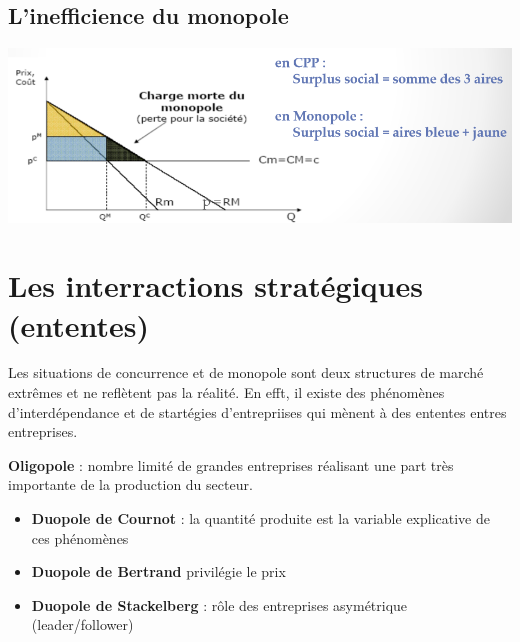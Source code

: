 \subsection{L'inefficience du monopole}
\begin{center}
    \includegraphics[scale=0.7]{Pics/Inefficience_monopole.png}
\end{center}
\newpage
\section{Les interractions stratégiques (ententes)}
Les situations de concurrence et de monopole sont deux structures de marché extrêmes et ne reflètent pas la réalité. En efft, il existe des phénomènes d'interdépendance et de startégies d'entrepriises qui mènent à des ententes entres entreprises. \newline

\textbf{\textcolor{BrickRed}{Oligopole}} : nombre limité de grandes entreprises réalisant une part très importante de la production du secteur.

\begin{itemize}
    \item \textbf{Duopole de Cournot} : la quantité produite est la variable explicative de ces phénomènes
    \item \textbf{Duopole de Bertrand} privilégie le prix
    \item \textbf{Duopole de Stackelberg} : rôle des entreprises asymétrique (leader/follower)
\end{itemize}
\newpage
